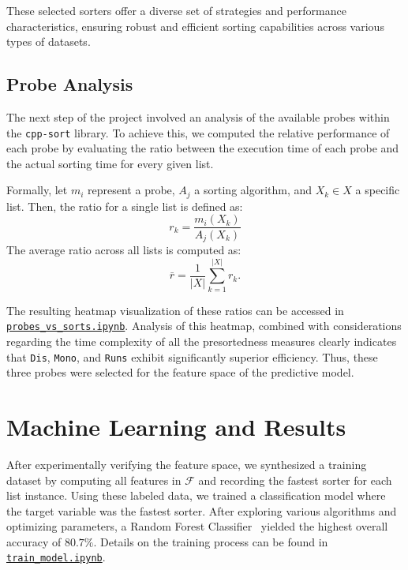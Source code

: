 \documentclass[twocolumn]{article}
\begin{document}
These selected sorters offer a diverse set of strategies and performance characteristics, ensuring robust and efficient sorting capabilities across various types of datasets.

\subsection{Probe Analysis}
The next step of the project involved an analysis of the available probes within the \texttt{cpp-sort} library. To achieve this, we computed the relative performance of each probe by evaluating the ratio between the execution time of each probe and the actual sorting time for every given list.

Formally, let $m_i$ represent a probe, $A_j$ a sorting algorithm, and $X_k \in X$ a specific list. Then, the ratio for a single list is defined as:
\[
    r_k = \frac{m_i(X_k)}{A_j(X_k)}
\]
The average ratio across all lists is computed as:
\[
    \bar{r} = \frac{1}{|X|}\sum_{k=1}^{|X|} r_k.
\]

The resulting heatmap visualization of these ratios can be accessed in \href{https://github.com/kiselevart/sorting-selector/blob/main/Implementation/analysis/probes_vs_sorts.ipynb}{\texttt{probes\_vs\_sorts.ipynb}}. Analysis of this heatmap, combined with considerations regarding the time complexity of all the presortedness measures clearly indicates that \texttt{Dis}, \texttt{Mono}, and \texttt{Runs} exhibit significantly superior efficiency. Thus, these three probes were selected for the feature space of the predictive model.

\section{Machine Learning and Results}
\label{sec:machine_learning}

After experimentally verifying the feature space, 
we synthesized a training dataset by computing all features in $\mathcal{F}$ and recording the 
fastest sorter for each list instance. Using these labeled data, we trained a classification 
model where the target variable was the fastest sorter. After exploring various algorithms and optimizing parameters, a Random 
Forest Classifier~\cite{breiman2001random} yielded the highest overall accuracy of $80.7\%$. 
Details on the training process can be found in 
\href{https://github.com/kiselevart/sorting-selector/blob/main/Implementation/analysis/train_model.ipynb}{\texttt{train\_model.ipynb}}.
\end{document}
